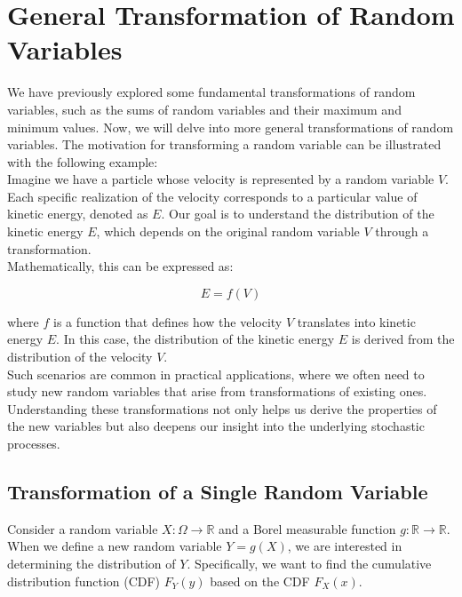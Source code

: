 \section{General Transformation of Random Variables}

We have previously explored some fundamental transformations of random variables, such as the sums of random variables and their maximum and minimum values. Now, we will delve into more general transformations of random variables. The motivation for transforming a random variable can be illustrated with the following example: \\

Imagine we have a particle whose velocity is represented by a random variable \( V \). Each specific realization of the velocity corresponds to a particular value of kinetic energy, denoted as \( E \). Our goal is to understand the distribution of the kinetic energy \( E \), which depends on the original random variable \( V \) through a transformation.\\

Mathematically, this can be expressed as:

\[
E = f(V)
\]

where \( f \) is a function that defines how the velocity \( V \) translates into kinetic energy \( E \). In this case, the distribution of the kinetic energy \( E \) is derived from the distribution of the velocity \( V \). \\

Such scenarios are common in practical applications, where we often need to study new random variables that arise from transformations of existing ones. Understanding these transformations not only helps us derive the properties of the new variables but also deepens our insight into the underlying stochastic processes.

\subsection{Transformation of a Single Random Variable}

Consider a random variable \( X : \Omega \to \mathbb{R} \) and a Borel measurable function \( g : \mathbb{R} \to \mathbb{R} \). When we define a new random variable \( Y = g(X) \), we are interested in determining the distribution of \( Y \). Specifically, we want to find the cumulative distribution function (CDF) \( F_Y(y) \) based on the CDF \( F_X(x) \).\\

